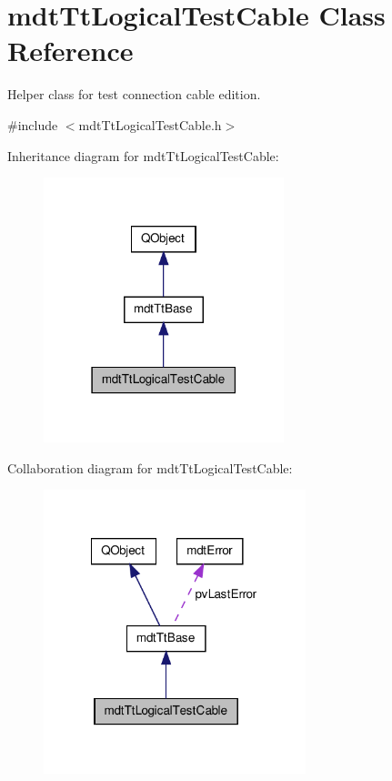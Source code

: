 \hypertarget{classmdt_tt_logical_test_cable}{\section{mdt\-Tt\-Logical\-Test\-Cable Class Reference}
\label{classmdt_tt_logical_test_cable}
}


Helper class for test connection cable edition.  




{\ttfamily \#include $<$mdt\-Tt\-Logical\-Test\-Cable.\-h$>$}



Inheritance diagram for mdt\-Tt\-Logical\-Test\-Cable\-:
\nopagebreak
\begin{figure}[H]
\begin{center}
\leavevmode
\includegraphics[width=198pt]{classmdt_tt_logical_test_cable__inherit__graph}
\end{center}
\end{figure}


Collaboration diagram for mdt\-Tt\-Logical\-Test\-Cable\-:
\nopagebreak
\begin{figure}[H]
\begin{center}
\leavevmode
\includegraphics[width=216pt]{classmdt_tt_logical_test_cable__coll__graph}
\end{center}
\end{figure}
